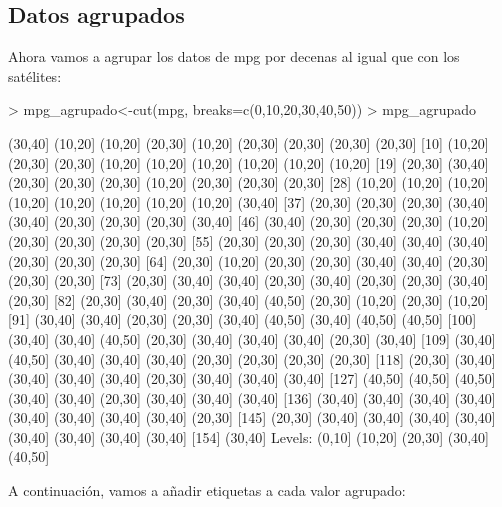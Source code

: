 \documentclass [a4paper] {article}
\begin{document}
\subsection{Datos agrupados}
Ahora vamos a agrupar los datos de mpg por decenas al igual que con los satélites:

\begin{Schunk}
\begin{Sinput}
> mpg_agrupado<-cut(mpg, breaks=c(0,10,20,30,40,50))
> mpg_agrupado
\end{Sinput}
\begin{Soutput}
  [1] (30,40] (10,20] (10,20] (20,30] (10,20] (20,30] (20,30] (20,30] (20,30]
 [10] (10,20] (20,30] (20,30] (10,20] (10,20] (10,20] (10,20] (10,20] (10,20]
 [19] (20,30] (30,40] (20,30] (20,30] (20,30] (10,20] (20,30] (20,30] (20,30]
 [28] (10,20] (10,20] (10,20] (10,20] (10,20] (10,20] (10,20] (10,20] (30,40]
 [37] (20,30] (20,30] (20,30] (30,40] (30,40] (20,30] (20,30] (20,30] (30,40]
 [46] (30,40] (20,30] (20,30] (20,30] (10,20] (20,30] (20,30] (20,30] (20,30]
 [55] (20,30] (20,30] (20,30] (30,40] (30,40] (30,40] (20,30] (20,30] (20,30]
 [64] (20,30] (10,20] (20,30] (20,30] (30,40] (30,40] (20,30] (20,30] (20,30]
 [73] (20,30] (30,40] (30,40] (20,30] (30,40] (20,30] (20,30] (30,40] (20,30]
 [82] (20,30] (30,40] (20,30] (30,40] (40,50] (20,30] (10,20] (20,30] (10,20]
 [91] (30,40] (30,40] (20,30] (20,30] (30,40] (40,50] (30,40] (40,50] (40,50]
[100] (30,40] (30,40] (40,50] (20,30] (30,40] (30,40] (30,40] (20,30] (30,40]
[109] (30,40] (40,50] (30,40] (30,40] (30,40] (20,30] (20,30] (20,30] (20,30]
[118] (20,30] (30,40] (30,40] (30,40] (30,40] (20,30] (30,40] (30,40] (30,40]
[127] (40,50] (40,50] (40,50] (30,40] (30,40] (20,30] (30,40] (30,40] (30,40]
[136] (30,40] (30,40] (30,40] (30,40] (30,40] (30,40] (30,40] (30,40] (20,30]
[145] (20,30] (30,40] (30,40] (30,40] (30,40] (30,40] (30,40] (30,40] (30,40]
[154] (30,40]
Levels: (0,10] (10,20] (20,30] (30,40] (40,50]
\end{Soutput}
\end{Schunk}
A continuación, vamos a añadir etiquetas a cada valor agrupado:
\end{document}
